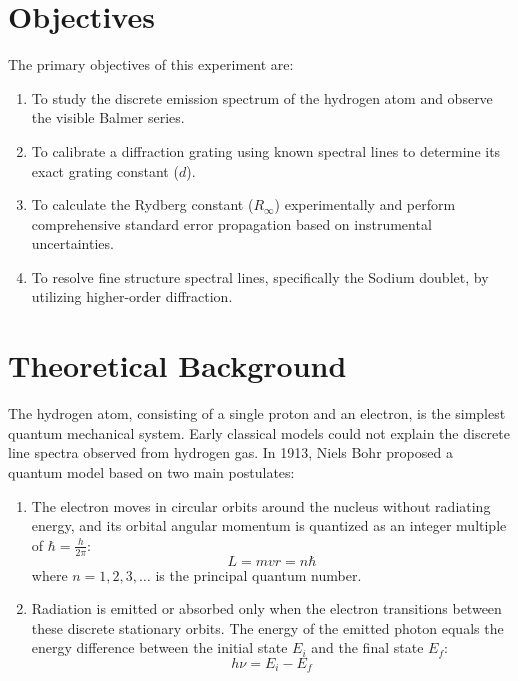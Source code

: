 \documentclass[a4paper,11pt]{article}
\begin{document}
\section{Objectives}
The primary objectives of this experiment are:
\begin{enumerate}
    \item To study the discrete emission spectrum of the hydrogen atom and observe the visible Balmer series.
    \item To calibrate a diffraction grating using known spectral lines to determine its exact grating constant ($d$).
    \item To calculate the Rydberg constant ($R_\infty$) experimentally and perform comprehensive standard error propagation based on instrumental uncertainties.
    \item To resolve fine structure spectral lines, specifically the Sodium doublet, by utilizing higher-order diffraction.
\end{enumerate}

\section{Theoretical Background}
The hydrogen atom, consisting of a single proton and an electron, is the simplest quantum mechanical system. Early classical models could not explain the discrete line spectra observed from hydrogen gas. In 1913, Niels Bohr proposed a quantum model based on two main postulates:
\begin{enumerate}
    \item The electron moves in circular orbits around the nucleus without radiating energy, and its orbital angular momentum is quantized as an integer multiple of $\hbar = \frac{h}{2\pi}$:
    \begin{equation}
        L = m v r = n \hbar
    \end{equation}
    where $n = 1, 2, 3, \dots$ is the principal quantum number.
    \item Radiation is emitted or absorbed only when the electron transitions between these discrete stationary orbits. The energy of the emitted photon equals the energy difference between the initial state $E_i$ and the final state $E_f$:
    \begin{equation}
        h \nu = E_i - E_f
    \end{equation}
\end{enumerate}
\end{document}
